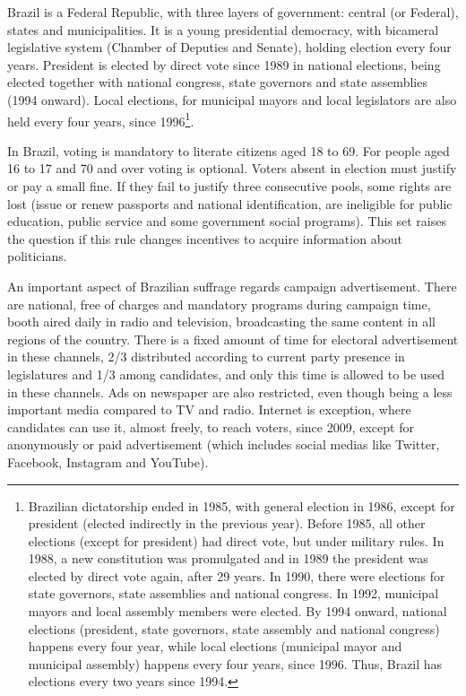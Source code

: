 \documentclass[
  12pt,
]{article}
\begin{document}
Brazil is a Federal Republic, with three layers of government: central
(or Federal), states and municipalities. It is a young presidential
democracy, with bicameral legislative system (Chamber of Deputies and
Senate), holding election every four years. President is elected by
direct vote since 1989 in national elections, being elected together
with national congress, state governors and state assemblies (1994
onward). Local elections, for municipal mayors and local legislators are
also held every four years, since 1996\footnote{Brazilian dictatorship
  ended in 1985, with general election in 1986, except for president
  (elected indirectly in the previous year). Before 1985, all other
  elections (except for president) had direct vote, but under military
  rules. In 1988, a new constitution was promulgated and in 1989 the
  president was elected by direct vote again, after 29 years. In 1990,
  there were elections for state governors, state assemblies and
  national congress. In 1992, municipal mayors and local assembly
  members were elected. By 1994 onward, national elections (president,
  state governors, state assembly and national congress) happens every
  four year, while local elections (municipal mayor and municipal
  assembly) happens every four years, since 1996. Thus, Brazil has
  elections every two years since 1994.}.

In Brazil, voting is mandatory to literate citizens aged 18 to 69. For
people aged 16 to 17 and 70 and over voting is optional. Voters absent
in election must justify or pay a small fine. If they fail to justify
three consecutive pools, some rights are lost (issue or renew passports
and national identification, are ineligible for public education, public
service and some government social programs). This set raises the
question if this rule changes incentives to acquire information about
politicians.

An important aspect of Brazilian suffrage regards campaign
advertisement. There are national, free of charges and mandatory
programs during campaign time, booth aired daily in radio and
television, broadcasting the same content in all regions of the country.
There is a fixed amount of time for electoral advertisement in these
channels, 2/3 distributed according to current party presence in
legislatures and 1/3 among candidates, and only this time is allowed to
be used in these channels. Ads on newspaper are also restricted, even
though being a less important media compared to TV and radio. Internet
is exception, where candidates can use it, almost freely, to reach
voters, since 2009, except for anonymously or paid advertisement (which
includes social medias like Twitter, Facebook, Instagram and YouTube).
\end{document}
